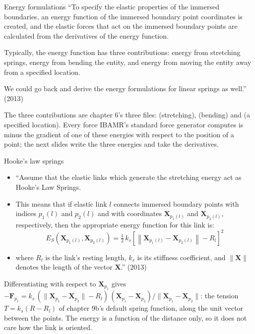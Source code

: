 \documentclass[aspectratio=169,11pt]{beamer}
\begin{document}
\begin{frame}{Energy formulations}
\label{fr:energy}
\small ``To specify the elastic properties of the immersed boundaries, an energy function of the immersed boundary point coordinates is created, and the elastic forces that act on the immersed boundary points are calculated from the derivatives of the energy function.
\vspace{1mm}

Typically, the energy function has three contributions: energy from stretching springs, energy from bending the entity, and energy from moving the entity away from a specified location.
\vspace{1mm}

We could go back and derive the energy formulations for linear springs as well.'' (2013)
\vspace{2mm}

\footnotesize The three contributions are chapter 6's three files:  (stretching),  (bending) and  (a specified location). Every force IBAMR's standard force generator computes is minus the gradient of one of these energies with respect to the position of a point; the next slides write the three energies and take the derivatives.
\end{frame}

\begin{frame}{Hooke's law springs}
\label{fr:hooke}
\small
\begin{itemize}
  \item ``Assume that the elastic links which generate the stretching energy act as Hooke's Law Springs.
  \item This means that if elastic link $l$ connects immersed boundary points with indices $p_1(l)$ and $p_2(l)$ and with coordinates $\mathbf{X}_{p_1(l)}$ and $\mathbf{X}_{p_2(l)}$, respectively, then the appropriate energy function for this link is:
\[
  E_S\!\left(\mathbf{X}_{p_1(l)}, \mathbf{X}_{p_2(l)}\right) = \tfrac12\,k_s\left[\left\|\mathbf{X}_{p_1(l)} - \mathbf{X}_{p_2(l)}\right\| - R_l\right]^2
\]
  \item where $R_l$ is the link's resting length, $k_s$ is its stiffness coefficient, and $\|\mathbf{X}\|$ denotes the length of the vector $\mathbf{X}$.'' (2013)
\end{itemize}
\vspace{1mm}
\footnotesize Differentiating with respect to $\mathbf{X}_{p_1}$ gives $-\mathbf{F}_{p_1} = k_s\,(\|\mathbf{X}_{p_1} - \mathbf{X}_{p_2}\| - R_l)\,(\mathbf{X}_{p_1} - \mathbf{X}_{p_2})/\|\mathbf{X}_{p_1} - \mathbf{X}_{p_2}\|$: the tension $T = k_s(R - R_l)$ of chapter 9b's default spring function, along the unit vector between the points. The energy is a function of the distance only, so it does not care how the link is oriented.
\end{frame}
\end{document}
